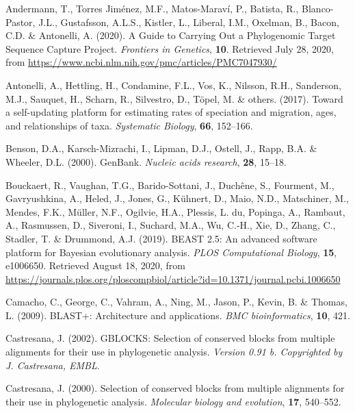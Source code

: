 \documentclass[]{article}
\begin{document}
\leavevmode\hypertarget{ref-andermann2020guide}{}%
Andermann, T., Torres Jiménez, M.F., Matos-Maraví, P., Batista, R., Blanco-Pastor, J.L., Gustafsson, A.L.S., Kistler, L., Liberal, I.M., Oxelman, B., Bacon, C.D. \& Antonelli, A. (2020). A Guide to Carrying Out a Phylogenomic Target Sequence Capture Project. \emph{Frontiers in Genetics}, \textbf{10}. Retrieved July 28, 2020, from \url{https://www.ncbi.nlm.nih.gov/pmc/articles/PMC7047930/}

\leavevmode\hypertarget{ref-antonelli2017toward}{}%
Antonelli, A., Hettling, H., Condamine, F.L., Vos, K., Nilsson, R.H., Sanderson, M.J., Sauquet, H., Scharn, R., Silvestro, D., Töpel, M. \& others. (2017). Toward a self-updating platform for estimating rates of speciation and migration, ages, and relationships of taxa. \emph{Systematic Biology}, \textbf{66}, 152--166.

\leavevmode\hypertarget{ref-benson2000genbank}{}%
Benson, D.A., Karsch-Mizrachi, I., Lipman, D.J., Ostell, J., Rapp, B.A. \& Wheeler, D.L. (2000). GenBank. \emph{Nucleic acids research}, \textbf{28}, 15--18.

\leavevmode\hypertarget{ref-bouckaert2019beast}{}%
Bouckaert, R., Vaughan, T.G., Barido-Sottani, J., Duchêne, S., Fourment, M., Gavryushkina, A., Heled, J., Jones, G., Kühnert, D., Maio, N.D., Matschiner, M., Mendes, F.K., Müller, N.F., Ogilvie, H.A., Plessis, L. du, Popinga, A., Rambaut, A., Rasmussen, D., Siveroni, I., Suchard, M.A., Wu, C.-H., Xie, D., Zhang, C., Stadler, T. \& Drummond, A.J. (2019). BEAST 2.5: An advanced software platform for Bayesian evolutionary analysis. \emph{PLOS Computational Biology}, \textbf{15}, e1006650. Retrieved August 18, 2020, from \url{https://journals.plos.org/ploscompbiol/article?id=10.1371/journal.pcbi.1006650}

\leavevmode\hypertarget{ref-camacho2009blast}{}%
Camacho, C., George, C., Vahram, A., Ning, M., Jason, P., Kevin, B. \& Thomas, L. (2009). BLAST+: Architecture and applications. \emph{BMC bioinformatics}, \textbf{10}, 421.

\leavevmode\hypertarget{ref-castresana2002gblocks}{}%
Castresana, J. (2002). GBLOCKS: Selection of conserved blocks from multiple alignments for their use in phylogenetic analysis. \emph{Version 0.91 b. Copyrighted by J. Castresana, EMBL}.

\leavevmode\hypertarget{ref-castresana2000selection}{}%
Castresana, J. (2000). Selection of conserved blocks from multiple alignments for their use in phylogenetic analysis. \emph{Molecular biology and evolution}, \textbf{17}, 540--552.
\end{document}
